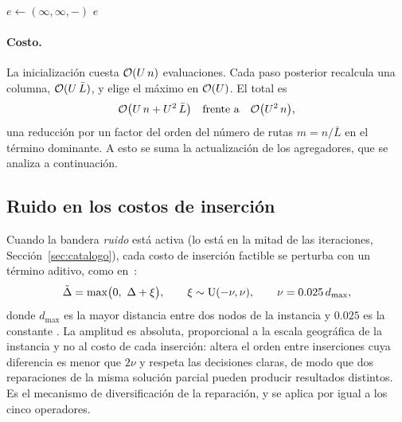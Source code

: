 \begin{algorithm}[H]
\caption{ ()}
\label{alg:entrada}
$e\gets(\infty,\infty,-)$\;
\Devolver $e$\;
\end{algorithm}

\paragraph{Costo.} La inicialización cuesta $\mathcal{O}(U\,n)$ evaluaciones. Cada paso posterior
recalcula una columna, $\mathcal{O}(U\,\bar{L})$, y elige el máximo en $\mathcal{O}(U)$. El total es
\[
\mathcal{O}\bigl(U\,n+U^{2}\,\bar{L}\bigr)\quad\text{frente a}\quad\mathcal{O}\bigl(U^{2}\,n\bigr),
\]
una reducción por un factor del orden del número de rutas $m=n/\bar{L}$ en el término
dominante. A esto se suma la actualización de los agregadores, que se analiza a continuación.

\subsection{Ruido en los costos de inserción}
\label{sec:ruido}

Cuando la bandera \emph{ruido} está activa (lo está en la mitad de las iteraciones,
Sección~\ref{sec:catalogo}), cada costo de inserción factible se perturba con un término
aditivo, como en~\cite{ropke2006}:
\begin{equation}
\tilde{\Delta}=\max\bigl(0,\ \Delta+\xi\bigr),\qquad \xi\sim\unif{-\nu}{\nu},\qquad
\nu=0.025\,d_{\max},
\label{eq:ruido}
\end{equation}
donde $d_{\max}$ es la mayor distancia entre dos nodos de la instancia y $0.025$ es la
constante . La amplitud es absoluta, proporcional a la escala geográfica de
la instancia y no al costo de cada inserción: altera el orden entre inserciones cuya
diferencia es menor que $2\nu$ y respeta las decisiones claras, de modo que dos reparaciones
de la misma solución parcial pueden producir resultados distintos. Es el mecanismo de
diversificación de la reparación, y se aplica por igual a los cinco operadores.

